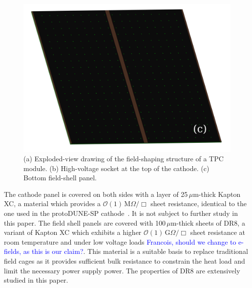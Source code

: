 \documentclass[a4paper,12pt]{article}
\newcommand{\DR}{DR8}
\newcommand{\RI}[1]{\textcolor{blue}{#1}}
\begin{document}
\begin{figure}[htbp]
\begin{minipage}[b]{.4\textwidth}
	\includegraphics[width=\linewidth]{field_shell_bottom.PNG}
\end{minipage}
\caption{(a) Exploded-view drawing of the field-shaping structure of a TPC module. (b) High-voltage socket at the top of the cathode. (c) Bottom field-shell panel.}
\label{fig:field_shell}
\end{figure}


The cathode panel is covered on both sides with a layer of 25\,$\mu$m-thick Kapton XC, a material which provides a $\mathcal{O}(1)\,$M$\Omega/\Box$ sheet resistance, identical to the one used in the protoDUNE-SP cathode~\cite{protodune_sp_tdr}. It is not subject to further study in this paper. The field shell panels are covered with 100\,$\mu$m-thick sheets of {\DR}, a variant of Kapton XC which exhibits a higher $\mathcal{O}(1)\,$G$\Omega/\Box$ sheet resistance at room temperature and under low voltage loads \RI{ Francois, should we change to e-fields, as this is our claim?}. This material is a suitable basis to replace traditional field cages as it provides sufficient bulk resistance to constrain the heat load and limit the necessary power supply power. The properties of {\DR} are extensively studied in this paper.%
\end{document}
